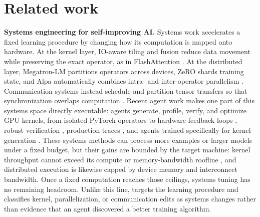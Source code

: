 \section{Related work}
\label{sec:related}


\textbf{Systems engineering for self-improving AI.}
Systems work accelerates a fixed learning procedure by changing how its computation is mapped onto
hardware.  At the kernel layer, IO-aware tiling and fusion reduce data movement while preserving the
exact operator, as in FlashAttention \citep{dao2022flashattention}.  At the distributed layer,
Megatron-LM partitions operators across devices, ZeRO shards training state, and Alpa automatically
combines intra- and inter-operator parallelism
\citep{shoeybi2019megatron,rajbhandari2020zero,zheng2022alpa}.  Communication systems instead
schedule and partition tensor transfers so that synchronization overlaps computation
\citep{peng2019bytescheduler}.  Recent agent work makes one part of this systems space directly
executable: agents generate, profile, verify, and optimize GPU kernels, from isolated PyTorch
operators \citep{ouyang2025kernelbench,chen2025cudallm} to hardware-feedback loops
\citep{zhang2025cudaforge}, robust verification \citep{lange2025robustkbench}, production traces
\citep{yang2026atrex}, and agents trained specifically for kernel generation
\citep{dai2026cudaagent}.  These systems methods can process more examples or larger models under a
fixed budget, but their gains are bounded by the target machine: kernel throughput cannot exceed its
compute or memory-bandwidth roofline \citep{williams2009roofline}, and distributed execution is
likewise capped by device memory and interconnect bandwidth.  Once a fixed computation reaches
those ceilings, systems tuning has no remaining headroom.  Unlike this line, \ai{} targets the
learning procedure and classifies kernel, parallelization, or communication edits as systems changes
rather than evidence that an agent discovered a better training algorithm.

